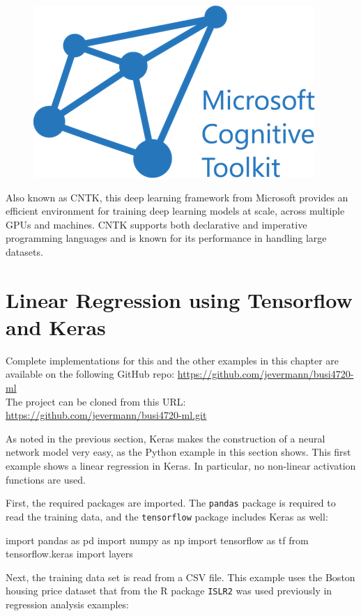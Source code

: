 \begin{figure}
\begin{center}
\includegraphics[width=.75in]{cntk_logo.png}
\end{center}
\end{figure}

Also known as CNTK, this deep learning framework from Microsoft provides an efficient environment for training deep learning models at scale, across multiple GPUs and machines. CNTK supports both declarative and imperative programming languages and is known for its performance in handling large datasets.

\section{Linear Regression using Tensorflow and Keras}

\begin{tcolorbox}[colback=alert]
\footnotesize
Complete implementations for this and the other examples in this chapter are available on the following GitHub repo:
\url{https://github.com/jevermann/busi4720-ml} \\

The project can be cloned from this URL:
\url{https://github.com/jevermann/busi4720-ml.git}
\normalsize
\end{tcolorbox}

As noted in the previous section, Keras makes the construction of a neural network model very easy, as the Python example in this section shows. This first example shows a linear regression in Keras. In particular, no non-linear activation functions are used. 

First, the required packages are imported. The \texttt{pandas} package is required to read the training data, and the \texttt{tensorflow} package includes Keras as well:

\begin{samepage}
\begin{pythoncode}
import pandas as pd
import numpy as np
import tensorflow as tf
from tensorflow.keras import layers
\end{pythoncode}
\end{samepage}

Next, the training data set is read from a CSV file. This example uses the Boston housing price dataset that from the R package \texttt{ISLR2} was used previously in regression analysis examples:

